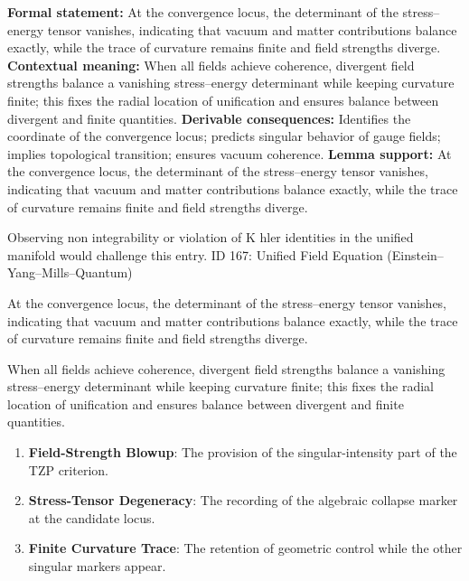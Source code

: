 \begingroup\footnotesize\setlength{\emergencystretch}{3em}\sloppy
\textbf{Formal statement:} At the convergence locus, the determinant of the stress--energy tensor vanishes, indicating that vacuum and matter contributions balance exactly, while the trace of curvature remains finite and field strengths diverge.  
\textbf{Contextual meaning:} When all fields achieve coherence, divergent field strengths balance a vanishing stress--energy determinant while keeping curvature finite; this fixes the radial location of unification and ensures balance between divergent and finite quantities.  
\textbf{Derivable consequences:} Identifies the coordinate of the convergence locus; predicts singular behavior of gauge fields; implies topological transition; ensures vacuum coherence.  
\textbf{Lemma support:} At the convergence locus, the determinant of the stress--energy tensor vanishes, indicating that vacuum and matter contributions balance exactly, while the trace of curvature remains finite and field strengths diverge.  \par
\endgroup

Observing non integrability or violation of K hler identities in the unified manifold would challenge this entry. ID 167: Unified Field Equation (Einstein--Yang--Mills--Quantum)

At the convergence locus, the determinant of the stress--energy tensor vanishes, indicating that vacuum and matter contributions balance exactly, while the trace of curvature remains finite and field strengths diverge.  

When all fields achieve coherence, divergent field strengths balance a vanishing stress--energy determinant while keeping curvature finite; this fixes the radial location of unification and ensures balance between divergent and finite quantities.  
\endgroup

\begin{enumerate}[leftmargin=1.6em,itemsep=6pt,topsep=4pt]
\item \textbf{Field-Strength Blowup}: The provision of the singular-intensity part of the TZP criterion.
\item \textbf{Stress-Tensor Degeneracy}: The recording of the algebraic collapse marker at the candidate locus.
\item \textbf{Finite Curvature Trace}: The retention of geometric control while the other singular markers appear.
\end{enumerate}

